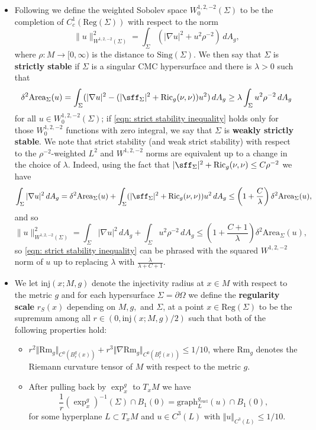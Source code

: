 \documentclass[12pt]{article}
\begin{document}
\begin{itemize}
    \item Following \cite{S99} we define the weighted Sobolev space $W^{1,2,-2}_0(\Sigma)$ to be the completion of $C^1_c(\mathrm{Reg}(\Sigma))$ with respect to the norm
    $$
    \|u\|_{W^{1,2,-2}(\Sigma)}^2 = \int_\Sigma (|\nabla u|^2 + u^2 \rho^{-2}) \, dA_g,
    $$
    where $\rho : M \rightarrow [0,\infty)$ is the distance to $\mathrm{Sing}(\Sigma)$. We then say that $\Sigma$ is \textbf{strictly stable} if $\Sigma$ is a singular CMC hypersurface and
    there is $\lambda > 0$ such that
    \begin{equation}\label{eqn: strict stability inequality}
       \delta^2\mathrm{Area}_\Sigma(u) =  \int_\Sigma (|\nabla u|^2 - (|\sff_\Sigma|^2 + \mathrm{Ric}_g(\nu,\nu))u^2) \, dA_g 
        \geq \lambda \int_\Sigma u^2 \rho^{-2} \, dA_g
    \end{equation}
    for all $u \in W^{1,2,-2}_0(\Sigma)$; if \eqref{eqn: strict stability inequality} holds only for those $W^{1,2,-2}_0$ functions with zero integral, we say that $\Sigma$ is \textbf{weakly strictly stable}. We note that strict stability (and weak strict stability) with respect to the $\rho^{-2}$-weighted $L^2$ and $W^{1,2,-2}$ norms are equivalent up to a change in the choice of $\lambda$. Indeed, using the fact that $|\sff_\Sigma|^2 + \mathrm{Ric}_g(\nu,\nu) \leq C\rho^{-2}$ we have
    $$
    \int_\Sigma |\nabla u|^2 \, dA_g = \delta^2\mathrm{Area}_\Sigma(u) + \int_\Sigma (|\sff_\Sigma|^2 + \mathrm{Ric}_g(\nu,\nu))u^2 \, dA_g \leq \left(1+\frac{C}{\lambda}\right)       \delta^2\mathrm{Area}_\Sigma(u),
    $$
    and so
    $$
    \|u\|_{W^{1,2,-2}(\Sigma)}^2 = \int_\Sigma |\nabla u|^2 \, dA_g + \int_\Sigma u^2\rho^{-2} \, dA_g \leq \left(1+\frac{C+1}{\lambda}\right)       \delta^2\mathrm{Area}_\Sigma(u),
    $$
    so \eqref{eqn: strict stability inequality} can be phrased with the squared $W^{1,2,-2}$ norm of $u$ up to replacing $\lambda$ with $\frac{\lambda}{\lambda + C + 1}$.
    
    \item We let $\mathrm{inj}(x;M,g)$ denote the injectivity radius at $x \in M$ with respect to the metric $g$ and for each hypersurface $\Sigma = \partial\Omega$ we define the \textbf{regularity scale} $r_S(x)$ depending on $M,g,$ and $\Sigma$, at a point $x \in \mathrm{Reg}(\Sigma)$ to be the supremum among all $r \in (0, \mathrm{inj}(x;M,g)/2)$ such that both of the following properties hold:
        \begin{itemize}
            \item $r^{2} \Vert \mathrm{Rm}_g\Vert_{C^0(B_r^g(x))}+r^3\Vert \nabla \mathrm{Rm}_g\Vert_{C^0(B_r^g(x))} \le 1/10$, where $\mathrm{Rm}_g$ denotes the Riemann curvature tensor of $M$ with respect to the metric $g$.
            \item After pulling back by $\exp^g_x$ to $T_xM$ we have
                $$\frac1r (\exp^g_x)^{-1}(\Sigma) \cap B_1(0) = \mathrm{graph}^{g_\mathrm{eucl}}_L (u) \cap B_1(0),$$
          for some hyperplane $L \subset T_xM$ and $u \in C^3(L)$ with $\Vert u\Vert_{C^3(L)} \le 1/10$.
        \end{itemize}



\end{itemize}
\end{document}
